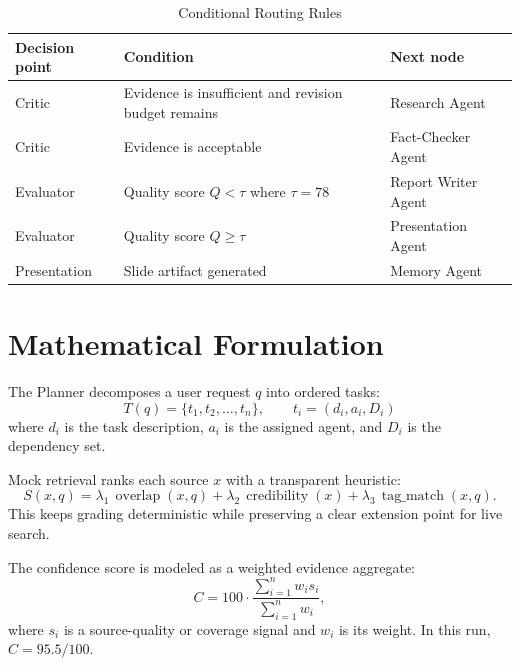 \documentclass[11pt]{article}
\begin{document}
\begin{table}[!htbp]
\centering
\caption{Conditional Routing Rules}
\label{tab:routing-rules}
\begingroup
\footnotesize
\setlength{\tabcolsep}{2.8pt}
\renewcommand{\arraystretch}{1.35}
\begin{adjustbox}{max width=\textwidth}
\begin{tabularx}{\textwidth}{@{}>{\RaggedRight\arraybackslash}p{}Y>{\RaggedRight\arraybackslash}p{0.24\textwidth}@{}}
\toprule
\textbf{Decision point} & \textbf{Condition} & \textbf{Next node} \\
\midrule
Critic & Evidence is insufficient and revision budget remains & Research Agent \\
Critic & Evidence is acceptable & Fact-Checker Agent \\
Evaluator & Quality score $Q < \tau$ where $\tau=78$ & Report Writer Agent \\
Evaluator & Quality score $Q \geq \tau$ & Presentation Agent \\
Presentation & Slide artifact generated & Memory Agent \\
\bottomrule
\end{tabularx}
\end{adjustbox}
\endgroup
\end{table}
\FloatBarrier


\section{Mathematical Formulation}
The Planner decomposes a user request $q$ into ordered tasks:
\begin{equation}
T(q)=\{t_1,t_2,\ldots,t_n\}, \qquad t_i=(d_i,a_i,D_i)
\end{equation}
where $d_i$ is the task description, $a_i$ is the assigned agent, and $D_i$ is the dependency set.

Mock retrieval ranks each source $x$ with a transparent heuristic:
\begin{equation}
S(x,q)=\lambda_1\,\operatorname{overlap}(x,q)+\lambda_2\,\operatorname{credibility}(x)+\lambda_3\,\operatorname{tag\_match}(x,q).
\end{equation}
This keeps grading deterministic while preserving a clear extension point for live search.

The confidence score is modeled as a weighted evidence aggregate:
\begin{equation}
C = 100 \cdot \frac{\sum_{i=1}^n w_i s_i}{\sum_{i=1}^n w_i},
\end{equation}
where $s_i$ is a source-quality or coverage signal and $w_i$ is its weight. In this run, $C=95.5/100$.
\end{document}
